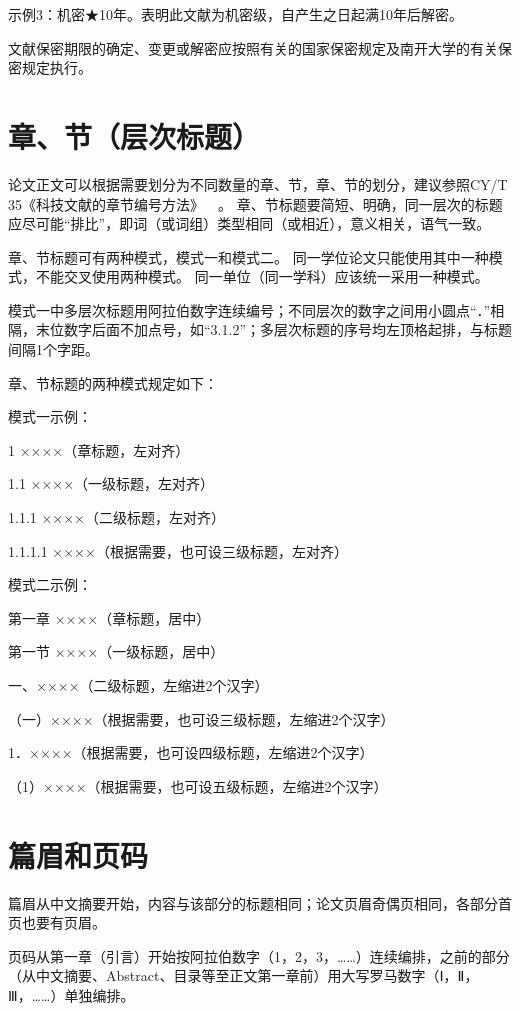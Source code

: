 示例3：机密★10年。表明此文献为机密级，自产生之日起满10年后解密。

文献保密期限的确定、变更或解密应按照有关的国家保密规定及南开大学的有关保密规定执行。

\section{章、节（层次标题）}

论文正文可以根据需要划分为不同数量的章、节，章、节的划分，建议参照CY/T 35《科技文献的章节编号方法》~~\cite{REF00000004}。
章、节标题要简短、明确，同一层次的标题应尽可能“排比”，即词（或词组）类型相同（或相近），意义相关，语气一致。

章、节标题可有两种模式，模式一和模式二。
同一学位论文只能使用其中一种模式，不能交叉使用两种模式。
同一单位（同一学科）应该统一采用一种模式。

模式一中多层次标题用阿拉伯数字连续编号；不同层次的数字之间用小圆点“．”相隔，末位数字后面不加点号，如“3.1.2”；多层次标题的序号均左顶格起排，与标题间隔1个字距。

章、节标题的两种模式规定如下：

模式一示例：

1 ××××（章标题，左对齐）

1.1 ××××（一级标题，左对齐）

1.1.1 ××××（二级标题，左对齐）

1.1.1.1 ××××（根据需要，也可设三级标题，左对齐）

模式二示例：

第一章 ××××（章标题，居中）

第一节 ××××（一级标题，居中）

一、××××（二级标题，左缩进2个汉字）

（一）××××（根据需要，也可设三级标题，左缩进2个汉字）

1．××××（根据需要，也可设四级标题，左缩进2个汉字）

（1）××××（根据需要，也可设五级标题，左缩进2个汉字）

\section{篇眉和页码}

篇眉从中文摘要开始，内容与该部分的标题相同；论文页眉奇偶页相同，各部分首页也要有页眉。

页码从第一章（引言）开始按阿拉伯数字（1，2，3，……）连续编排，之前的部分（从中文摘要、Abstract、目录等至正文第一章前）用大写罗马数字（Ⅰ，Ⅱ，Ⅲ，……）单独编排。

